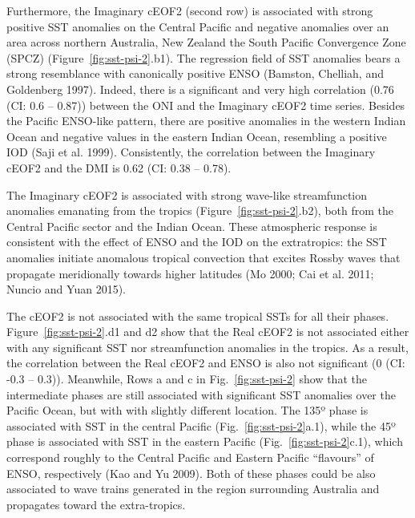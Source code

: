 \documentclass[smallextended]{svjour3}       %
\begin{document}
Furthermore, the Imaginary cEOF2 (second row) is associated with strong positive SST anomalies on the Central Pacific and negative anomalies over an area across northern Australia, New Zealand the South Pacific Convergence Zone (SPCZ) (Figure~\ref{fig:sst-psi-2}.b1).
The regression field of SST anomalies bears a strong resemblance with canonically positive ENSO (Bamston, Chelliah, and Goldenberg 1997).
Indeed, there is a significant and very high correlation (0.76 (CI: 0.6 -- 0.87)) between the ONI and the Imaginary cEOF2 time series.
Besides the Pacific ENSO-like pattern, there are positive anomalies in the western Indian Ocean and negative values in the eastern Indian Ocean, resembling a positive IOD (Saji et al. 1999).
Consistently, the correlation between the Imaginary cEOF2 and the DMI is 0.62 (CI: 0.38 -- 0.78).

The Imaginary cEOF2 is associated with strong wave-like streamfunction anomalies emanating from the tropics (Figure~\ref{fig:sst-psi-2}.b2), both from the Central Pacific sector and the Indian Ocean.
These atmospheric response is consistent with the effect of ENSO and the IOD on the extratropics: the SST anomalies initiate anomalous tropical convection that excites Rossby waves that propagate meridionally towards higher latitudes (Mo 2000; Cai et al. 2011; Nuncio and Yuan 2015).

The cEOF2 is not associated with the same tropical SSTs for all their phases.
Figure~\ref{fig:sst-psi-2}.d1 and d2 show that the Real cEOF2 is not associated either with any significant SST nor streamfunction anomalies in the tropics.
As a result, the correlation between the Real cEOF2 and ENSO is also not significant (0 (CI: -0.3 -- 0.3)).
Meanwhile, Rows a and c in Fig.~\ref{fig:sst-psi-2} show that the intermediate phases are still associated with significant SST anomalies over the Pacific Ocean, but with with slightly different location.
The 135º phase is associated with SST in the central Pacific (Fig.~\ref{fig:sst-psi-2}a.1), while the 45º phase is associated with SST in the eastern Pacific (Fig.~\ref{fig:sst-psi-2}c.1), which correspond roughly to the Central Pacific and Eastern Pacific ``flavours'' of ENSO, respectively (Kao and Yu 2009).
Both of these phases could be also associated to wave trains generated in the region surrounding Australia and propagates toward the extra-tropics.
\end{document}

